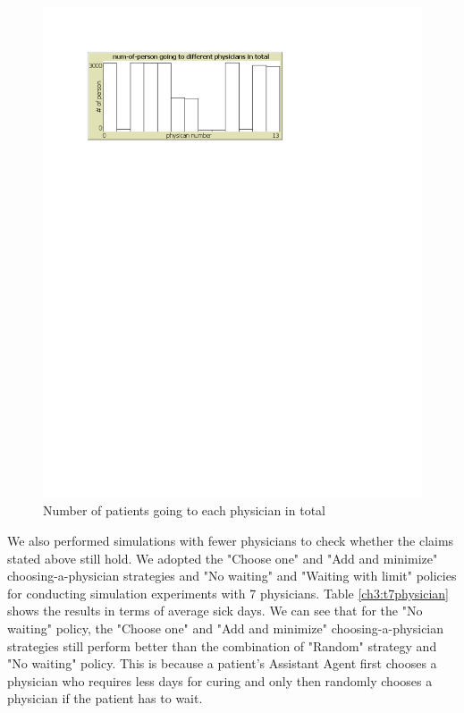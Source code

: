 \begin{figure}
\centering
\includegraphics[scale=1]{chap3/chap3-fpatients.pdf}
\caption{Number of patients going to each physician in total}
\label{ch3:ftotalnum-of-patients}
\end{figure}

We also performed simulations with fewer physicians to check whether the claims stated above still hold. We adopted the "Choose one" and "Add and minimize" choosing-a-physician strategies and "No waiting" and "Waiting with limit" policies for conducting simulation experiments with 7 physicians. Table \ref{ch3:t7physician} shows the results in terms of average sick days. We can see that for the "No waiting" policy, the "Choose one" and "Add and minimize" choosing-a-physician strategies still perform better than the combination of "Random" strategy and "No waiting" policy. This is because a patient's Assistant Agent first chooses a physician who requires less days for curing and only then randomly chooses a physician if the patient has to wait.

